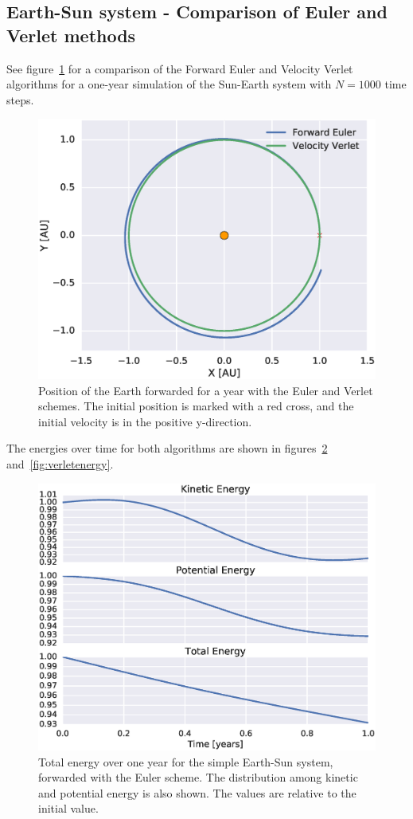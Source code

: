 \documentclass[aps,reprint]{revtex4-1}
\begin{document}
\subsection{Earth-Sun system - Comparison of Euler and Verlet methods}
\label{sec:earthsunresults}
See figure~\ref{fig:earthsunorbits} for a comparison of the Forward Euler and
Velocity Verlet algorithms for a one-year simulation of the Sun-Earth system with
$N = 1000$ time steps.
\begin{figure}[H]
  \centering
  \includegraphics[width=\columnwidth]{figures/eulerverlet.eps}
  \caption{Position of the Earth forwarded for a year with the Euler and Verlet
  schemes. The initial position is marked with a red cross, and the initial
  velocity is in the positive y-direction.}
  \label{fig:earthsunorbits}
\end{figure}
The energies over time for both algorithms
are shown in figures~\ref{fig:eulerenergy} and~\ref{fig:verletenergy}.
\begin{figure}[H]
  \includegraphics[width=\columnwidth]{figures/energy_euler.eps}
  \caption{Total energy over one year for the simple Earth-Sun system,
  forwarded with the Euler scheme. The distribution among kinetic and potential
  energy is also shown. The values are relative to the initial value.}
  \label{fig:eulerenergy}
\end{figure}
\end{document}
